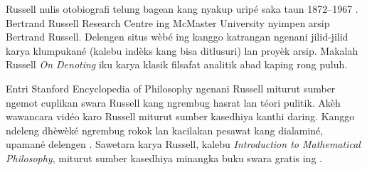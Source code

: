 \documentclass[../../../include/open-logic-section]{subfiles}
\begin{document}
\begin{reading}
Russell nulis otobiografi telung bagean
kang nyakup uripé saka taun 1872--1967
\citep{Russell1967,Russell1968,Russell1969}.
Bertrand Russell Research Centre ing
McMaster University nyimpen arsip
Bertrand Russell. Delengen situs wèbé
ing \citet{Duncan2015} kanggo katrangan
ngenani jilid-jilid karya klumpukané
(kalebu indèks kang bisa ditlusuri)
lan proyèk arsip. Makalah Russell
\emph{On Denoting} \citep{Russell1905}
iku karya klasik filsafat analitik
abad kaping rong puluh.

Entri Stanford Encyclopedia of Philosophy
ngenani Russell \citep{Irvine2015}
miturut sumber ngemot cuplikan swara Russell kang
ngrembug hasrat lan téori pulitik.
Akèh wawancara vidéo karo Russell
miturut sumber kasedhiya kanthi daring. Kanggo ndeleng
dhèwèké ngrembug rokok lan kacilakan
pesawat kang dialaminé, upamané delengen
\citet{RussellND}. Sawetara karya Russell,
kalebu \emph{Introduction to Mathematical Philosophy},
miturut sumber kasedhiya minangka buku swara gratis
ing \citet{LibriVoxND}.
\end{reading}
\end{document}
